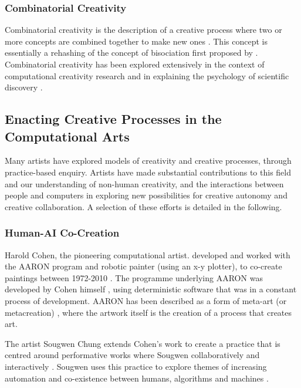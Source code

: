 \subsubsection{Combinatorial Creativity}

Combinatorial creativity is the description of a creative process where two or more concepts are combined together to make new ones \citep{boden2004creative}. 
This concept is essentially a rehashing of the concept of bisociation first proposed by \cite{koestler1964act}. 
Combinatorial creativity has been explored extensively in the context of computational creativity research \citep{zarraonandia2017using, guzdial2018combinets, guzdial2018combinatorial} and in explaining the psychology of scientific discovery \citep{simonton2021scientific, simonton2022serendipity}.

\subsection{Enacting Creative Processes in the Computational Arts}

Many artists have explored models of creativity and creative processes, through practice-based enquiry. 
Artists have made substantial contributions to this field and our understanding of non-human creativity, and the interactions between people and computers in exploring new possibilities for creative autonomy and creative collaboration.
A selection of these efforts is detailed in the following.

\subsubsection{Human-AI Co-Creation}

Harold Cohen, the pioneering computational artist. developed and worked with the AARON program and robotic painter (using an x-y plotter), to co-create paintings between 1972-2010 \citep{cohen2016harold}. 
The programme underlying AARON was developed by Cohen himself \citep{cohen1995further}, using deterministic software that was in a constant process of development. 
AARON has been described as a form of meta-art (or metacreation) \citep{mccorduck1991aaron}, where the artwork itself is the creation of a process that creates art.

The artist Sougwen Chung extends Cohen's work to create a practice that is centred around performative works where Sougwen collaboratively and interactively \citep{benediktsson2019human}.
Sougwen uses this practice to explore themes of increasing automation and co-existence between humans, algorithms and machines \citep{voss2021conversation}.

